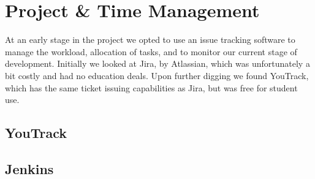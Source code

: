 \section{Project \& Time Management}
At an early stage in the project we opted to use an issue tracking software to manage the workload, allocation of tasks, and to monitor our current stage of development.
Initially we looked at Jira, by Atlassian, which was unfortunately a bit costly and had no education deals. Upon further digging we found YouTrack, which has the same ticket issuing capabilities as Jira, but was free for student use.
\subsection{YouTrack}

\subsection{Jenkins}